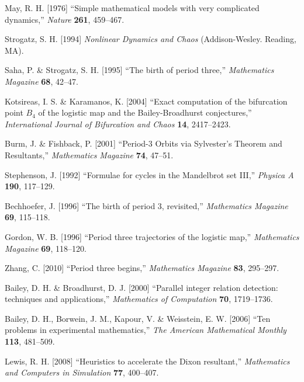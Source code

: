 \documentclass{ws-ijbc}
\begin{document}
\begin{thebibliography}{50}


  May, R. H. [1976]
  ``Simple mathematical models with very complicated dynamics,''
  {\it Nature}
  \textbf{261},
  459--467.

  Strogatz, S. H. [1994]
  {\it Nonlinear Dynamics and Chaos}
  (Addison-Wesley. Reading, MA).

  Saha, P. \& Strogatz, S. H. [1995]
  ``The birth of period three,''
  {\it Mathematics Magazine}
  \textbf{68},
  42--47.

  Kotsireas, I. S. \& Karamanos, K. [2004]
  ``Exact computation of the bifurcation point $B_4$ of the logistic map
  and  the Bailey-Broadhurst conjectures,''
  {\it International Journal of Bifurcation and Chaos}
  \textbf{14},
  2417--2423.

  Burm, J. \& Fishback, P. [2001]
  ``Period-3 Orbits via Sylvester's Theorem and Resultants,''
  {\it Mathematics Magazine}
  \textbf{74},
  47--51.

  Stephenson, J. [1992]
  ``Formulae for cycles in the Mandelbrot set III,''
  {\it Physica A}
  \textbf{190},
  117--129.

  Bechhoefer, J. [1996]
  ``The birth of period 3, revisited,''
  {\it Mathematics Magazine}
  \textbf{69},
  115--118.

  Gordon, W. B. [1996]
  ``Period three trajectories of the logistic map,''
  {\it Mathematics Magazine}
  \textbf{69},
  118--120.

  Zhang, C. [2010]
  ``Period three begins,''
  {\it Mathematics Magazine}
  \textbf{83},
  295--297.

  Bailey, D. H. \& Broadhurst, D. J. [2000]
  ``Parallel integer relation detection: techniques and applications,''
  {\it Mathematics of Computation}
  \textbf{70},
  1719--1736.

  Bailey, D. H., Borwein, J. M., Kapour, V. \& Weisstein, E. W. [2006]
  ``Ten problems in experimental mathematics,''
  {\it The American Mathematical Monthly}
  \textbf{113},
  481--509.

  Lewis, R. H. [2008]
  ``Heuristics to accelerate the Dixon resultant,''
  {\it Mathematics and Computers in Simulation}
  \textbf{77},
  400--407.


\end{thebibliography}
\end{document}

